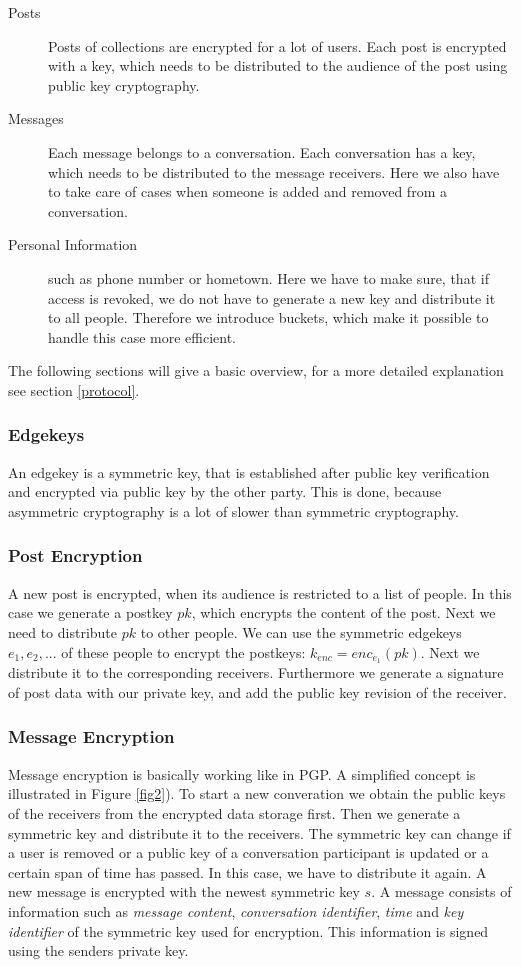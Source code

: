 \documentclass{scrartcl}
\begin{document}
\begin{description}
  \item[Posts] Posts of collections are encrypted for a lot of users. Each post is encrypted with a key, which needs to be distributed to the audience of the post using public key cryptography.
  \item[Messages] Each message belongs to a conversation. Each conversation has a key, which needs to be distributed to the message receivers. Here we also have to take care of cases when someone is added and removed from a conversation.
  \item[Personal Information] such as phone number or hometown. Here we have to make sure, that if access is revoked, we do not have to generate a new key and distribute it to all people. Therefore we introduce buckets, which make it possible to handle this case more efficient.
\end{description}

The following sections will give a basic overview, for a more detailed explanation see section \ref{protocol}.
 \subsubsection{Edgekeys}
 An edgekey is a symmetric key, that is established after public key verification and encrypted via public key by the other party. This is done, because asymmetric cryptography is a lot of slower than symmetric cryptography.
 \subsubsection{Post Encryption}
A new post is encrypted, when its audience is restricted to a list of people. 
In this case we generate a postkey $pk$, which encrypts the content of the post. Next we need to distribute $pk$ to other people. We can use the symmetric edgekeys $e_1, e_2, ...$ of these people to encrypt the postkeys: $k_{enc} = enc_{e_1} (pk)$. Next we distribute it to the corresponding receivers. Furthermore we generate a signature of post data with our private key, and add the public key revision of the receiver.
 \subsubsection{Message Encryption}
 
  Message encryption is basically working like in PGP. A simplified concept is illustrated in Figure \ref{fig2}). 
To start a new converation we obtain the public keys of the receivers from the encrypted data storage first. Then we generate a symmetric key and distribute it to the receivers. The symmetric key can change if a user is removed or a public key of a conversation participant is updated or a certain span of time has passed. In this case, we have to distribute it again. A new message is encrypted with the newest symmetric key $s$.
A message consists of information such as \textit{message content}, \textit{conversation identifier}, \textit{time} and \textit{key identifier} of the symmetric key used for encryption. This information is  signed using the senders private key.
\end{document}
